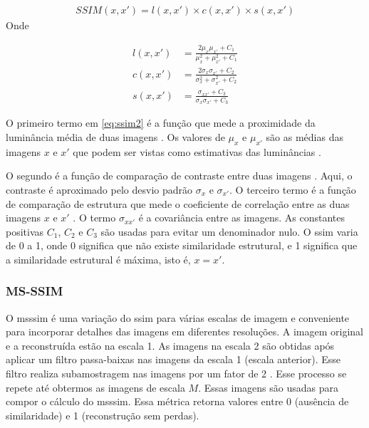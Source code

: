 \begin{equation}
\begin{aligned}
SSIM(x,x') = l(x,x') \times c(x,x') \times s(x,x') 
\end{aligned}
\end{equation}
Onde

\begin{equation}
\label{eq:ssim2}
\begin{aligned}
l(x,x') &= \frac{2\mu_x\mu_{x'} + C_1}{\mu_{x}^2+\mu_{x'}^2 + C_1} \\
c(x,x') &= \frac{2\sigma_x\sigma_{x'} + C_2}{\sigma_{x}^2+\sigma_{x'}^2 + C_2} \\
s(x,x') &= \frac{\sigma_{xx'}+ C_3}{\sigma_{x}\sigma_{x'} + C_3}	
\end{aligned} 
\end{equation}


O primeiro termo em \ref{eq:ssim2} é a função que mede a proximidade da luminância média de duas imagens \cite{hore2010image}. Os valores de $\mu_x$ e $\mu_{x'}$ são as médias das imagens $x$ e $x'$ que podem ser vistas como estimativas das luminâncias \cite{wang2003multiscale}. 

O segundo é a função de comparação de contraste entre duas imagens \cite{hore2010image}. Aqui, o contraste é aproximado pelo desvio padrão $\sigma_x$ e $\sigma_{x'}$.
O terceiro termo é a função de comparação de estrutura que mede o coeficiente de correlação entre as duas imagens $x$ e $x'$ \cite{hore2010image}. O termo $\sigma_{xx'}$ é a covariância entre as imagens.  As constantes positivas $C_1$, $C_2$ e $C_3$ são usadas para evitar um denominador nulo.
O \acrshort{ssim} varia de 0 a 1, onde 0 significa que não existe similaridade estrutural, e 1 significa que a similaridade estrutural é máxima, isto é, $x = x'$.


\subsubsection{MS-SSIM}
O \acrshort{msssim} \cite{wang2003multiscale} é uma variação do \acrshort{ssim} para várias escalas de imagem e conveniente para incorporar detalhes das imagens em diferentes resoluções. A imagem original e a reconstruída estão na escala 1. As imagens na escala 2 são obtidas após aplicar um filtro passa-baixas nas imagens da escala 1 (escala anterior). Esse filtro realiza subamostragem nas imagens por um fator de 2 \cite{wang2003multiscale}. Esse processo se repete até obtermos as imagens de escala $M$. 
Essas imagens são usadas para compor o cálculo do \acrshort{msssim}. Essa métrica retorna valores entre 0 (ausência de similaridade) e 1 (reconstrução sem perdas). 